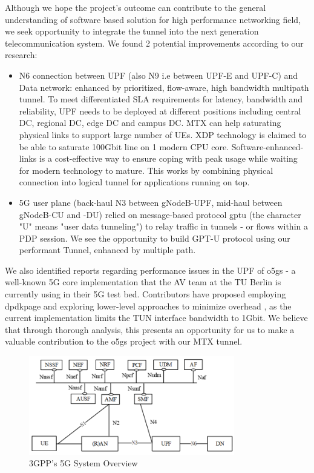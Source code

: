 Although we hope the project's outcome can contribute to the general understanding of software based solution for high performance networking field, we seek opportunity to integrate the tunnel into the next generation telecommunication system. We found 2 potential improvements according to our research: 
\begin{itemize}
    \item N6 connection between UPF (also N9 i.e between UPF-E and UPF-C) and Data network: enhanced by prioritized, flow-aware, high bandwidth multipath tunnel. To meet differentiated SLA requirements for latency, bandwidth and reliability, UPF needs to be deployed at different positions including central DC, regional DC, edge DC and campus DC. MTX can help saturating physical links to support large number of UEs. XDP technology is claimed to be able to saturate 100Gbit line on 1 modern CPU core. Software-enhanced-links is a cost-effective way to ensure coping with peak usage while waiting for modern technology to mature. This works by combining physical connection into logical tunnel for applications running on top.
    \item 5G user plane (back-haul N3 between gNodeB-UPF, mid-haul between gNodeB-CU and -DU) relied on message-based protocol \ac{gptu} (the character "U" means "user data tunneling") to relay traffic in tunnels - or flows within a PDP session. We see the opportunity to build GPT-U protocol using our performant Tunnel, enhanced by multiple path.
\end{itemize}

We also identified reports regarding performance issues in the \ac{UPF} of \ac{o5gs} - a well-known 5G core implementation that the AV team at the TU Berlin is currently using in their 5G test bed. Contributors have proposed employing \ac{dpdkpage} and exploring lower-level approaches to minimize overhead \cite{open5gs_github_dpdk}\cite{open5gs_github_udp_perf_cap}, as the current implementation limits the TUN interface bandwidth to 1Gbit. We believe that through thorough analysis, this presents an opportunity for us to make a valuable contribution to the \ac{o5gs} project with our MTX tunnel.

\begin{figure}[H]
	\centering
	\includegraphics[width=0.8\textwidth]{resources/images/3gpp_5g_system_overview.png}
	\caption{3GPP's 5G System Overview \cite{3gpp_5g_system_overview}}
    \label{fig:introduction:3gpp_5g_system_overview}
\end{figure}



